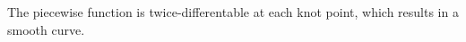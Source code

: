 




The piecewise function is twice-differentable at each knot point, which results in a smooth curve.





